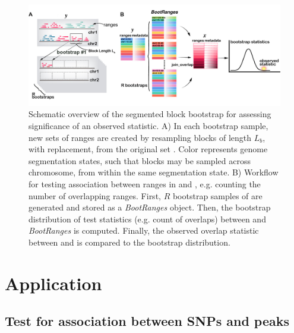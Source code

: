 \begin{figure}[t]
\centering
\setlength{\abovecaptionskip}{-0.05cm}
\includegraphics[scale=0.16]{Figures/bootRanges.jpg}
\caption{
  Schematic overview of the segmented block bootstrap 
  for assessing significance of an observed statistic.
  A) In each bootstrap sample, 
  new sets of ranges are created by resampling blocks of length 
  $L_b$, with replacement, from the original set . 
  Color represents genome segmentation states, such that blocks 
  may be sampled across chromosome, from within the same 
  segmentation state.
  B) Workflow for testing association between 
  ranges in  and ,  
  e.g. counting the number of overlapping ranges. 
  First, $R$ bootstrap samples of  are 
  generated and stored as a \textit{BootRanges} object.
  Then, the bootstrap distribution of test statistics 
  (e.g. count of overlaps) 
  between  and \textit{BootRanges} is computed.
  Finally, the observed overlap statistic between  and  
  is compared to the bootstrap distribution.}
\label{fig:framework}
\end{figure}


\section{Application}
\subsection{Test for association between SNPs and peaks}


